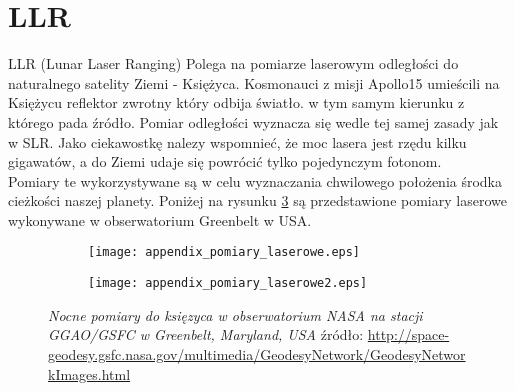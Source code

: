 \section{LLR}
\noindent LLR (Lunar Laser Ranging)
Polega na pomiarze laserowym odległości do naturalnego satelity Ziemi - Księżyca.
Kosmonauci z misji Apollo15 umieścili na Księżycu reflektor zwrotny który odbija światło.  
w tym samym kierunku z którego pada źródło. Pomiar odległości wyznacza się wedle tej samej zasady jak w SLR.
Jako ciekawostkę nalezy wspomnieć, że moc lasera jest rzędu kilku gigawatów, a do Ziemi udaje się powrócić 
tylko pojedynczym fotonom.\\
\indent Pomiary te wykorzystywane są w celu wyznaczania chwilowego położenia środka cieżkości naszej planety.
Poniżej na rysunku \ref{fig:LLR_both} są przedstawione pomiary laserowe wykonywane w obserwatorium Greenbelt w USA.
\begin{figure}[H]
\centering
\begin{subfigure}{.5\textwidth}
  \centering
  \texttt{[image: appendix\_pomiary\_laserowe.eps]}
  \caption{}
  \label{fig:LLR_sub1}
\end{subfigure}%
\begin{subfigure}{.5\textwidth}
  \centering
  \texttt{[image: appendix\_pomiary\_laserowe2.eps]}
  \caption{}
  \label{fig:LLR_sub2}
\end{subfigure}
\caption{\textit{Nocne pomiary do księzyca w obserwatorium NASA na stacji GGAO/GSFC w Greenbelt, Maryland, USA}
źródło: \protect\url{http://space-geodesy.gsfc.nasa.gov/multimedia/GeodesyNetwork/GeodesyNetworkImages.html}}
\label{fig:LLR_both}
\end{figure}

